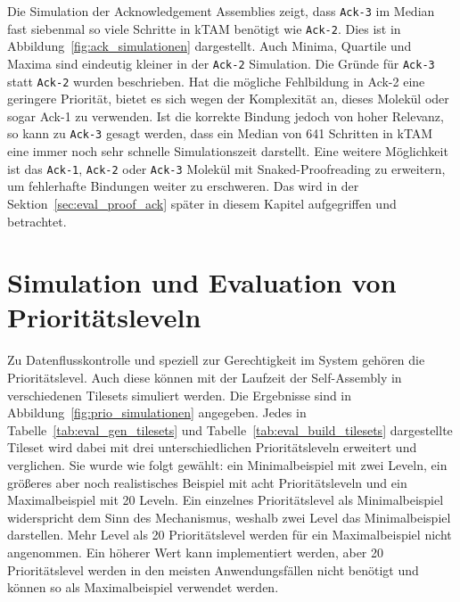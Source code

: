 Die Simulation der Acknowledgement Assemblies zeigt, dass \texttt{Ack-3} im Median fast siebenmal so viele Schritte in kTAM benötigt wie \texttt{Ack-2}. Dies ist in Abbildung~\ref{fig:ack_simulationen} dargestellt. Auch Minima, Quartile und Maxima sind eindeutig kleiner in der \texttt{Ack-2} Simulation. Die Gründe für \texttt{Ack-3} statt \texttt{Ack-2} wurden beschrieben. Hat die mögliche Fehlbildung in Ack-2 eine geringere Priorität, bietet es sich wegen der Komplexität an, dieses Molekül oder sogar Ack-1 zu verwenden. Ist die korrekte Bindung jedoch von hoher Relevanz, so kann zu \texttt{Ack-3} gesagt werden, dass ein Median von 641 Schritten in kTAM eine immer noch sehr schnelle Simulationszeit darstellt.
Eine weitere Möglichkeit ist das \texttt{Ack-1}, \texttt{Ack-2} oder \texttt{Ack-3} Molekül mit Snaked-Proofreading zu erweitern, um fehlerhafte Bindungen weiter zu erschweren. Das wird in der Sektion~\ref{sec:eval_proof_ack} später in diesem Kapitel aufgegriffen und betrachtet.

\section{Simulation und Evaluation von Prioritätsleveln}

Zu Datenflusskontrolle und speziell zur Gerechtigkeit im System gehören die Prioritätslevel. Auch diese können mit der Laufzeit der Self-Assembly in verschiedenen Tilesets simuliert werden. Die Ergebnisse sind in Abbildung~\ref{fig:prio_simulationen} angegeben. Jedes in Tabelle~\ref{tab:eval_gen_tilesets} und Tabelle~\ref{tab:eval_build_tilesets} dargestellte Tileset wird dabei mit drei unterschiedlichen Prioritätsleveln erweitert und verglichen. Sie wurde wie folgt gewählt: ein Minimalbeispiel mit zwei Leveln, ein größeres aber noch realistisches Beispiel mit acht Prioritätsleveln und ein Maximalbeispiel mit 20 Leveln. Ein einzelnes Prioritätslevel als Minimalbeispiel widerspricht dem Sinn des Mechanismus, weshalb zwei Level das Minimalbeispiel darstellen. Mehr Level als 20 Prioritätslevel werden für ein Maximalbeispiel nicht angenommen. Ein höherer Wert kann implementiert werden, aber 20 Prioritätslevel werden in den meisten Anwendungsfällen nicht benötigt und können so als Maximalbeispiel verwendet werden.


